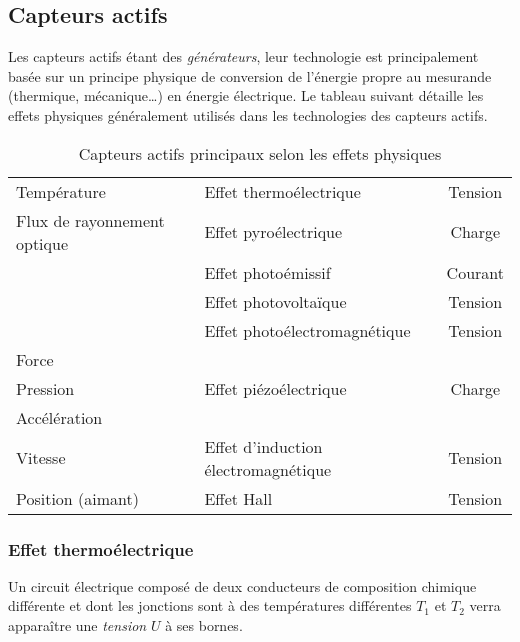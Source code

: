 \subsection{Capteurs actifs}

Les capteurs actifs étant des \emph{générateurs}, leur technologie est principalement basée sur un principe physique de conversion de l'énergie propre au mesurande (thermique, mécanique\ldots) en énergie électrique. Le tableau suivant détaille les effets physiques généralement utilisés dans les technologies des capteurs actifs.

\begin{table}[H]
\caption{Capteurs actifs principaux selon les effets physiques}
\begin{tabularx}{\linewidth}{XXC}
\toprule
{}						&						&	 \\
\midrule
Température									& Effet thermoélectrique						& Tension \\
\addlinespace
Flux de rayonnement optique			& Effet pyroélectrique							& Charge \\
													& Effet photoémissif							& Courant \\
													& Effet photovoltaïque					& Tension \\
													& Effet photoélectromagnétique		& Tension \\
\addlinespace
Force											& 													& 			 \\
Pression										& 	Effet piézoélectrique						& 	Charge		 \\
Accélération									& 													& 			 \\
\addlinespace
Vitesse											& 	Effet d'induction électromagnétique		& 	Tension		 \\
\addlinespace
Position (aimant)							&  Effet Hall									& 	Tension		 \\
\bottomrule
\end{tabularx}
\end{table}

\subsubsection{Effet thermoélectrique}

Un circuit électrique composé de deux conducteurs de composition chimique différente et dont les jonctions sont à des températures différentes $T_1$ et $T_2$ verra apparaître une \emph{tension} $U$ à ses bornes.

